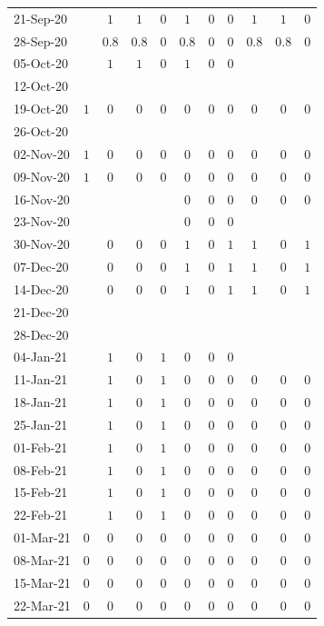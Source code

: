 \documentclass[fleqn,10pt]{wlscirep}
\begin{document}
\begin{table}
\begin{center}
{\begin{tabular}{l|c|cc|c|cc|c|cc|c}
21-Sep-20	&		&$1$	&$1$	&$0$	&$1$	&$0$	&$0$	&$1$	&$1$	&$0$	\\
28-Sep-20	&		&$0.8$	&$0.8$	&$0$	&$0.8$	&$0$	&$0$	&$0.8$	&$0.8$	&$0$	\\
05-Oct-20	&		&$1$	&$1$	&$0$	&$1$	&$0$	&$0$	&	&	&	\\
12-Oct-20	&		&	&	&	&	&	&	&	&	&	\\
19-Oct-20	&$1$		&$0$	&$0$	&$0$	&$0$	&$0$	&$0$	&$0$	&$0$	&$0$	\\
26-Oct-20	&		&	&	&	&	&	&	&	&	&	\\
02-Nov-20	&$1$		&$0$	&$0$	&$0$	&$0$	&$0$	&$0$	&$0$	&$0$	&$0$	\\
09-Nov-20	&$1$		&$0$	&$0$	&$0$	&$0$	&$0$	&$0$	&$0$	&$0$	&$0$	\\
16-Nov-20	&		&	&	&	&$0$	&$0$	&$0$	&$0$	&$0$	&$0$	\\
23-Nov-20	&		&	&	&	&$0$	&$0$	&$0$	&	&	&	\\
30-Nov-20	&		&$0$	&$0$	&$0$	&$1$	&$0$	&$1$	&$1$	&$0$	&$1$	\\
07-Dec-20	&		&$0$	&$0$	&$0$	&$1$	&$0$	&$1$	&$1$	&$0$	&$1$	\\
14-Dec-20	&		&$0$	&$0$	&$0$	&$1$	&$0$	&$1$	&$1$	&$0$	&$1$	\\
21-Dec-20	&		&	&	&	&	&	&	&	&	&	\\
28-Dec-20	&		&	&	&	&	&	&	&	&	&	\\
04-Jan-21	&		&$1$	&$0$	&$1$	&$0$	&$0$	&$0$	&	&	&	\\
11-Jan-21	&		&$1$	&$0$	&$1$	&$0$	&$0$	&$0$	&$0$	&$0$	&$0$	\\
18-Jan-21	&		&$1$	&$0$	&$1$	&$0$	&$0$	&$0$	&$0$	&$0$	&$0$	\\
25-Jan-21	&		&$1$	&$0$	&$1$	&$0$	&$0$	&$0$	&$0$	&$0$	&$0$	\\
01-Feb-21	&		&$1$	&$0$	&$1$	&$0$	&$0$	&$0$	&$0$	&$0$	&$0$	\\
08-Feb-21	&		&$1$	&$0$	&$1$	&$0$	&$0$	&$0$	&$0$	&$0$	&$0$	\\
15-Feb-21	&		&$1$	&$0$	&$1$	&$0$	&$0$	&$0$	&$0$	&$0$	&$0$	\\
22-Feb-21	&		&$1$	&$0$	&$1$	&$0$	&$0$	&$0$	&$0$	&$0$	&$0$	\\
01-Mar-21	&$0$		&$0$	&$0$	&$0$	&$0$	&$0$	&$0$	&$0$	&$0$	&$0$	\\
08-Mar-21	&$0$		&$0$	&$0$	&$0$	&$0$	&$0$	&$0$	&$0$	&$0$	&$0$	\\
15-Mar-21	&$0$		&$0$	&$0$	&$0$	&$0$	&$0$	&$0$	&$0$	&$0$	&$0$	\\
22-Mar-21	&$0$		&$0$	&$0$	&$0$	&$0$	&$0$	&$0$	&$0$	&$0$	&$0$	\\

\end{tabular}}
\end{center}
\end{table}
\end{document}
